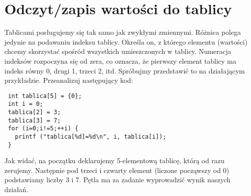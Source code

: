 \documentclass[11pt,a4paper]{article}
\begin{document}
\section*{Odczyt/zapis wartości do tablicy}
Tablicami posługujemy się tak samo jak zwykłymi zmiennymi. Różnica polega jedynie na podawaniu indeksu tablicy. Określa on, z którego elementu (wartości) chcemy skorzystać spośród wszystkich umieszczonych w tablicy. Numeracja indeksów rozpoczyna się od zera, co oznacza, że pierwszy element tablicy ma indeks równy 0, drugi 1, trzeci 2, itd.
Spróbujmy przedstawić to na działającym przykładzie. Przeanalizuj następujący kod:
\begin{lstlisting}
 int tablica[5] = {0};
 int i = 0;
 tablica[2] = 3;
 tablica[3] = 7;
 for (i=0;i!=5;++i) {
   printf ("tablica[%d]=%d\n", i, tablica[i]);
 }
\end{lstlisting}
Jak widać, na początku deklarujemy 5-elementową tablicę, którą od razu zerujemy. Następnie pod trzeci i czwarty element (liczone począwszy od 0) podstawiamy liczby 3 i 7. Pętla ma za zadanie wyprowadzić wynik naszych działań.
\end{document}
